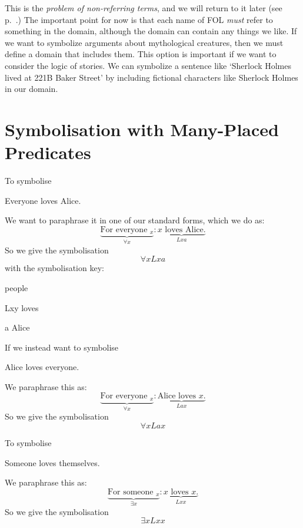 This is the \emph{problem of non-referring terms}, and we will return to it later (see p.~\pageref{subsec.defdesc}.) The important point for now is that each name of FOL \emph{must} refer to something in the domain, although the domain can contain any things we like. If we want to symbolize arguments about mythological creatures, then we must define a domain that includes them. This option is important if we want to consider the logic of stories. We can symbolize a sentence like `Sherlock Holmes lived at 221B Baker Street' by including fictional characters like Sherlock Holmes in our domain.



\section{Symbolisation with Many-Placed Predicates}



To symbolise
\begin{earg}
	\item[\ex{loveseveryone1}] Everyone loves Alice.
\end{earg}
We want to paraphrase it in one of our standard forms, which we do as:
\begin{equation*}
\underbrace{\text{For everyone $_x$}}_{\forall x}: \underbrace{\text{$x$ loves Alice.}}_{Lxa}
\end{equation*}
So we give the symbolisation $$\forall x Lxa$$ with the symbolisation key:
\begin{ekey}
\item[\text{domain}] people
\item[Lxy] loves 
\item[a] Alice
\end{ekey}
If we instead want to symbolise
\begin{earg}
	\item[\ex{loveseveryone2}] Alice loves everyone.
\end{earg}
We paraphrase this as:
\begin{equation*}
\underbrace{\text{For everyone $_x$}}_{\forall x}: \underbrace{\text{Alice loves $x$.}}_{Lax}
\end{equation*}
So we give the symbolisation $$\forall x Lax$$

To symbolise
\begin{earg}
	\item[\ex{lovesesomeonethemselves}] Someone loves themselves.
\end{earg}
We paraphrase this as:
\begin{equation*}
\underbrace{\text{For someone $_x$}}_{\exists x}: \underbrace{\text{$x$ loves $x$.}}_{Lxx}
\end{equation*}
So we give the symbolisation $$\exists x Lxx$$



